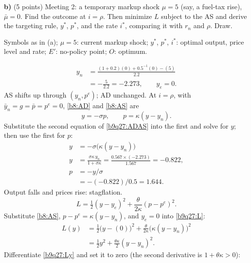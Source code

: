 \textbf{b)} (5 points) Meeting 2: a temporary markup shock $\mu=5$ (say, a fuel-tax rise), $\bar\mu=0$. Find the outcome at $i=\rho$. Then
minimize $L$ subject to the AS and derive the targeting rule, $y^\ast$, $p^\ast$, and the rate $i^\ast$, comparing it with $r_n$ and $\rho$. Draw.
\resolespaco
\begin{sol}
\begin{notacao}
\item Symbols as in (a); $\mu=5$: current markup shock; $y^\ast$, $p^\ast$, $i^\ast$: optimal output, price level and rate; $E'$: no-policy point; $O$: optimum.
\end{notacao}
\begin{align*}
y_n&=\frac{(1+0.2)(0)+0.5^{-1}(0)-(5)}{2.2}\\
&=-\frac{5}{2.2}=-2.273,\qquad y_e=0 .
\end{align*}
AS shifts up through $(y_n,p^e)$; AD unchanged. At $i=\rho$, with $\bar y_n=g=\bar p=p^e=0$, \eqref{b8:AD} and \eqref{b8:AS} are
\begin{equation}
y=-\sigma p,\qquad p=\kappa(y-y_n). \label{b9q27:ADAS}
\end{equation}
Substitute the second equation of \eqref{b9q27:ADAS} into the first and solve for $y$; then use the first for $p$:
\begin{align*}
y&=-\sigma\big(\kappa(y-y_n)\big)\\
y&=\frac{\sigma\kappa\,y_n}{1+\sigma\kappa}=\frac{0.567\times(-2.273)}{1.567}=-0.822,\\
p&=-y/\sigma\\
&=-(-0.822)/0.5=1.644 .
\end{align*}
Output falls and prices rise: stagflation.
\begin{equation}
L=\tfrac12(y-y_e)^2+\frac{\theta}{2\kappa}(p-p^e)^2. \label{b9q27:L}
\end{equation}
Substitute \eqref{b8:AS}, $p-p^e=\kappa(y-y_n)$, and $y_e=0$ into \eqref{b9q27:L}:
\begin{align}
L(y)&=\tfrac12\big(y-(0)\big)^2+\frac{\theta}{2\kappa}\big(\kappa(y-y_n)\big)^2\nonumber\\
&=\tfrac12y^2+\frac{\theta\kappa}2(y-y_n)^2. \label{b9q27:Ly}
\end{align}
Differentiate \eqref{b9q27:Ly} and set it to zero (the second derivative is $1+\theta\kappa>0$):

\end{sol}
